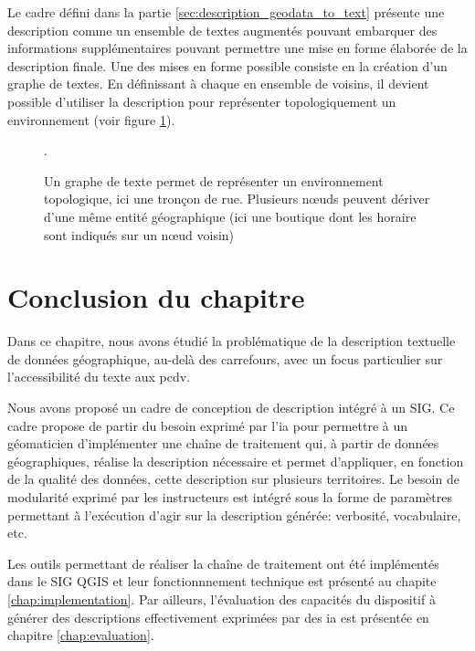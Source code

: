 \label{sec:description_graphe}

Le cadre défini dans la partie \ref{sec:description_geodata_to_text} présente une description comme un ensemble de textes augmentés pouvant embarquer des informations supplémentaires pouvant permettre une mise en forme élaborée de la description finale. Une des mises en forme possible consiste en la création d'un graphe de textes. En définissant à chaque en ensemble de voisins, il devient possible d'utiliser la description pour représenter topologiquement un environnement (voir figure \ref{fig:desc_graphe_texte}).

\begin{figure}
    \centering
    \caption[Graphe de texte d'un tronçon de rue]{Un graphe de texte permet de représenter un environnement topologique, ici une tronçon de rue. Plusieurs nœuds peuvent dériver d'une même entité géographique (ici une boutique dont les horaire sont indiqués sur un nœud voisin)}.
    \label{fig:desc_graphe_texte}
\end{figure}
\section{Conclusion du chapitre}

Dans ce chapitre, nous avons étudié la problématique de la description textuelle de données géographique, au-delà des carrefours, avec un focus particulier sur l'accessibilité du texte aux \gls{pcdv}. 

\newpar{}

Nous avons proposé un cadre de conception de description intégré à un SIG. Ce cadre propose de partir du besoin exprimé par l'\gls{ia} pour permettre à un géomaticien d'implémenter une chaîne de traitement qui, à partir de données géographiques, réalise la description nécessaire et permet d'appliquer, en fonction de la qualité des données, cette description sur plusieurs territoires. Le besoin de modularité exprimé par les instructeurs est intégré sous la forme de paramètres permettant à l'exécution d'agir sur la description générée: verbosité, vocabulaire, etc. 

\newpar{}

Les outils permettant de réaliser la chaîne de traitement ont été implémentés dans le SIG QGIS et leur fonctionnnement technique est présenté au chapite \ref{chap:implementation}. Par ailleurs, l'évaluation des capacités du dispositif à générer des descriptions effectivement exprimées par des \gls{ia} est présentée en chapitre \ref{chap:evaluation}.